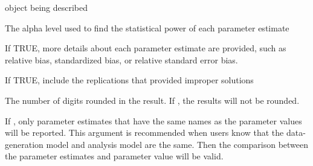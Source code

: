\documentclass[a4paper]{book}
\begin{document}
\begin{Arguments}
\begin{ldescription}
\item[\code{object}] 
 object being described

\item[\code{alpha}] 
The alpha level used to find the statistical power of each parameter estimate

\item[\code{detail}] 
If TRUE, more details about each parameter estimate are provided, such as relative bias, standardized bias, or relative standard error bias.

\item[\code{improper}] 
If TRUE, include the replications that provided improper solutions

\item[\code{digits}] 
The number of digits rounded in the result. If , the results will not be rounded.

\item[\code{matchParam}] 
If , only parameter estimates that have the same names as the parameter values will be reported. This argument is recommended when users know that the data-generation model and analysis model are the same. Then the comparison between the parameter estimates and parameter value will be valid.

\end{ldescription}
\end{Arguments}
%
\end{document}
